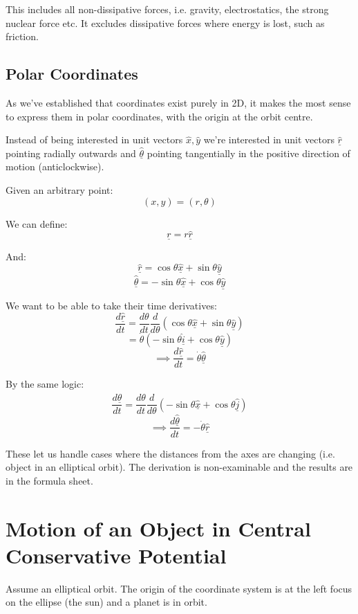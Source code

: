 This includes all non-dissipative forces, i.e. gravity, electrostatics, the strong nuclear force etc. It excludes dissipative forces where energy is lost, such as friction.

\subsection{Polar Coordinates}
As we've established that coordinates exist purely in 2D, it makes the most sense to express them in polar coordinates, with the origin at the orbit centre.

Instead of being interested in unit vectors $\hat{x}, \hat{y}$ we're interested in unit vectors $\hat{\underline{r}}$ pointing radially outwards and $\hat{\underline{\theta}}$ pointing tangentially in the positive direction of motion (anticlockwise).

Given an arbitrary point:
\[
    (x, y) = (r, \theta)
\]

We can define:
\[
    \underline{r} = r \hat{\underline{r}} \tag{1}
\]

And:
\[
    \boxed{\hat{\underline{r}} = \cos \theta \hat{\underline{x}} + \sin \theta \hat{\underline{y}}}
\]
\[
    \boxed{\hat{\underline{\theta}} = - \sin \theta \hat{\underline{x}} + \cos \theta \hat{\underline{y}}}
\]

We want to be able to take their time derivatives:
\[
    \frac{d \hat{\underline{r}}}{dt} = \frac{d \theta}{dt} \frac{d}{d \theta} \left(\cos \theta \hat{\underline{x}} + \sin \theta \hat{\underline{y}}\right)
\]
\[
    = \dot{\theta} \left(- \sin \theta \hat{\underline{i}} + \cos \theta \hat{\underline{y}}\right)
\]
\[
    \boxed{\implies \frac{d \hat{\underline{r}}}{dt} = \dot{\theta} \hat{\underline{\theta}}} \tag{2}
\]

By the same logic:
\[
    \frac{d \hat{\underline{\theta}}}{dt} = \frac{d \theta}{dt} \frac{d}{d \theta} \left(- \sin \theta \hat{\underline{x}} + \cos \theta \hat{\underline{j}}\right)
\]
\[
    \implies \boxed{\frac{d \hat{\underline{\theta}}}{dt} = - \dot{\theta} \hat{\underline{r}}} \tag{3}
\]

These let us handle cases where the distances from the axes are changing (i.e. object in an elliptical orbit). The derivation is non-examinable and the results are in the formula sheet.

\section{Motion of an Object in Central Conservative Potential}
Assume an elliptical orbit. The origin of the coordinate system is at the left focus on the ellipse (the sun) and a planet is in orbit.

